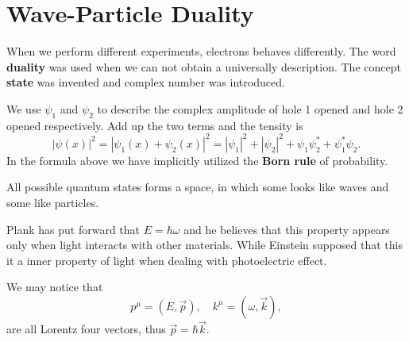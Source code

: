 
\chapter{Wave-Particle Duality}
When we perform different experiments, electrons behaves differently. The word \textbf{duality} was used when we can not obtain a universally description. The concept \textbf{state} was invented and complex number was introduced. 

We use $\psi_1$ and $\psi_2$ to describe the complex amplitude of hole 1 opened and hole 2 opened respectively. Add up the two terms and the tensity is
\begin{equation}
  \left| \psi(x) \right| ^{2} = \left| \psi_1(x) + \psi_2(x) \right| ^{2} = \left| \psi_1 \right| ^{2} + \left| \psi_2 \right| ^{2} + \psi_1 \psi_2^{*} + \psi_1^{*}\psi_2.
\end{equation}
In the formula above we have implicitly utilized the \textbf{Born rule} of probability.

All possible quantum states forms a space, in which some looks like waves and some like particles.

Plank has put forward that $E = \hbar \omega$ and he believes that this property appears only when light interacts with other materials.
While Einstein supposed that this it a inner property of light when dealing with photoelectric effect.

We may notice that 
\begin{equation}
  p^{\mu} = (E, \vec{p}), \quad k^{\mu} = (\omega, \vec{k}),
\end{equation}
are all Lorentz four vectors, thus $\vec{p} = \hbar \vec{k}$.

